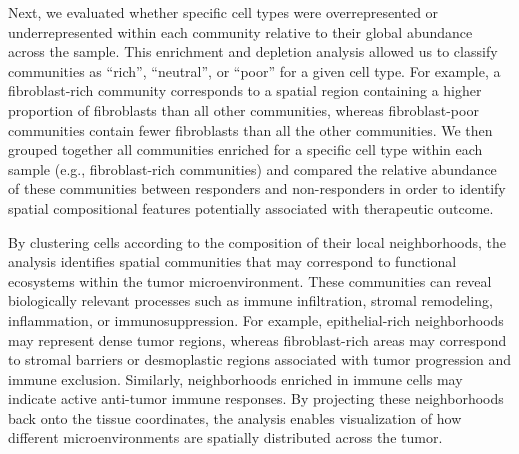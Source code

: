 Next, we evaluated whether specific cell types were overrepresented or underrepresented within each community relative to their global abundance across the sample. This enrichment and depletion analysis allowed us to classify communities as ``rich'', ``neutral'', or ``poor'' for a given cell type. For example, a fibroblast-rich community corresponds to a spatial region containing a higher proportion of fibroblasts than all other communities, whereas fibroblast-poor communities contain fewer fibroblasts than all the other communities. We then grouped together all communities enriched for a specific cell type within each sample (e.g., fibroblast-rich communities) and compared the relative abundance of these communities between responders and non-responders in order to identify spatial compositional features potentially associated with therapeutic outcome.

By clustering cells according to the composition of their local neighborhoods, the analysis identifies spatial communities that may correspond to functional ecosystems within the tumor microenvironment. These communities can reveal biologically relevant processes such as immune infiltration, stromal remodeling, inflammation, or immunosuppression. For example, epithelial-rich neighborhoods may represent dense tumor regions, whereas fibroblast-rich areas may correspond to stromal barriers or desmoplastic regions associated with tumor progression and immune exclusion. Similarly, neighborhoods enriched in immune cells may indicate active anti-tumor immune responses. By projecting these neighborhoods back onto the tissue coordinates, the analysis enables visualization of how different microenvironments are spatially distributed across the tumor. 

